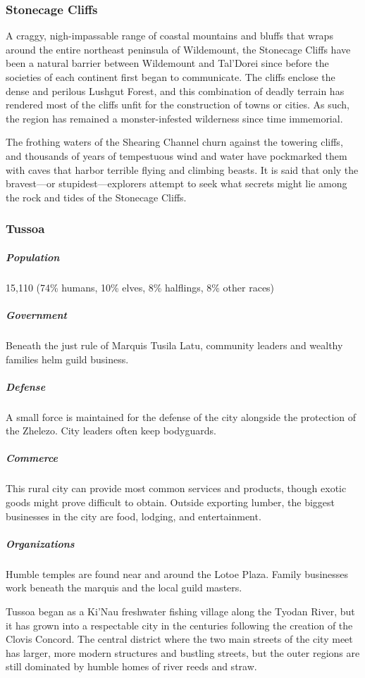 \documentclass[10pt,a4paper,twoside,bg=print,twocolumn,openany,nodeprecatedcode]{dndbook}
\begin{document}
\subsubsection{Stonecage Cliffs}
A craggy, nigh-impassable range of coastal mountains and bluffs that wraps around the entire northeast peninsula of Wildemount, the Stonecage Cliffs have been a natural barrier between Wildemount and Tal'Dorei since before the societies of each continent first began to communicate. The cliffs enclose the dense and perilous Lushgut Forest, and this combination of deadly terrain has rendered most of the cliffs unfit for the construction of towns or cities. As such, the region has remained a monster-infested wilderness since time immemorial.

The frothing waters of the Shearing Channel churn against the towering cliffs, and thousands of years of tempestuous wind and water have pockmarked them with caves that harbor terrible flying and climbing beasts. It is said that only the bravest—or stupidest—explorers attempt to seek what secrets might lie among the rock and tides of the Stonecage Cliffs.

\subsubsection{Tussoa}
\subparagraph{Population}
15,110 (74\% humans, 10\% elves, 8\% halflings, 8\% other races)

\subparagraph{Government}
Beneath the just rule of Marquis Tusila Latu, community leaders and wealthy families helm guild business.

\subparagraph{Defense}
A small force is maintained for the defense of the city alongside the protection of the Zhelezo. City leaders often keep bodyguards.

\subparagraph{Commerce}
This rural city can provide most common services and products, though exotic goods might prove difficult to obtain. Outside exporting lumber, the biggest businesses in the city are food, lodging, and entertainment.

\subparagraph{Organizations}
Humble temples are found near and around the Lotoe Plaza. Family businesses work beneath the marquis and the local guild masters.

Tussoa began as a Ki'Nau freshwater fishing village along the Tyodan River, but it has grown into a respectable city in the centuries following the creation of the Clovis Concord. The central district where the two main streets of the city meet has larger, more modern structures and bustling streets, but the outer regions are still dominated by humble homes of river reeds and straw.
\end{document}
